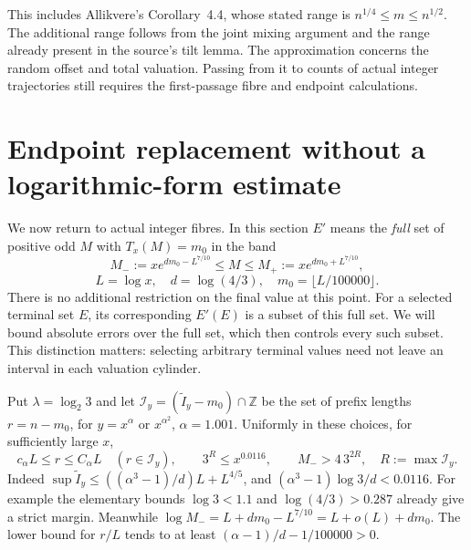 \documentclass[11pt]{article}
\theoremstyle{remark}\newtheorem{remark}[proposition]{Remark}
\newcommand{\ZZ}{\mathbb Z}
\begin{document}
This includes Allikvere's Corollary~4.4, whose stated range is
$n^{1/4}\le m\le n^{1/2}$. The additional range follows from the joint
mixing argument and the range already present in the source's tilt lemma.
The approximation concerns the random offset and total valuation. Passing
from it to counts of actual integer trajectories still requires the
first-passage fibre and endpoint calculations.

\section{Endpoint replacement without a logarithmic-form estimate}

We now return to actual integer fibres. In this section $E'$ means the
\emph{full} set of positive odd $M$ with $T_x(M)=m_0$ in the band
\[
 M_-:=xe^{d m_0-L^{7/10}}\le M\le
 M_+:=xe^{d m_0+L^{7/10}},
\]
\[
 L=\log x,\quad d=\log(4/3),\quad m_0=\lfloor L/100000\rfloor.
\]
There is no additional restriction on the final value at this point.
For a selected terminal set $E$, its corresponding $E'(E)$ is a subset
of this full set. We will bound absolute errors over the full set, which
then controls every such subset. This distinction matters: selecting
arbitrary terminal values need not leave an interval in each valuation
cylinder.

Put $\lambda=\log_2 3$ and let
$\mathcal I_y=(\widetilde I_y-m_0)\cap\ZZ$ be the set of prefix lengths
$r=n-m_0$, for $y=x^\alpha$ or $x^{\alpha^2}$, $\alpha=1.001$.
Uniformly in these choices, for sufficiently large $x$,
\begin{equation}\label{eq:window-scales}
 c_\alpha L\le r\le C_\alpha L\quad(r\in\mathcal I_y),\qquad
 3^R\le x^{0.0116},\qquad
 M_->4\,3^{2R},\quad R:=\max\mathcal I_y.
\end{equation}
Indeed $\sup\widetilde I_y\le((\alpha^3-1)/d)L+L^{4/5}$,
and $(\alpha^3-1)\log3/d<0.0116$. For example the elementary bounds
$\log3<1.1$ and $\log(4/3)>0.287$ already give a strict margin.
Meanwhile $\log M_-=L+dm_0-L^{7/10}=L+o(L)+dm_0$.
The lower bound for $r/L$ tends to at least
$(\alpha-1)/d-1/100000>0$.
\end{document}
